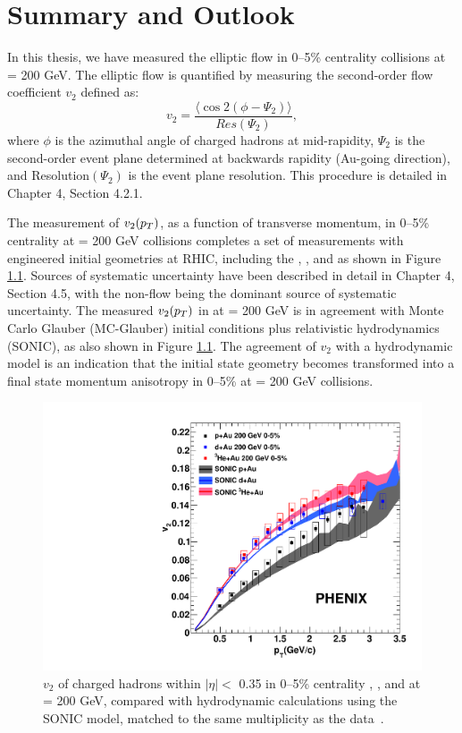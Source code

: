 \chapter{Summary and Outlook}
In this thesis, we have measured the elliptic flow in 0--5\% centrality \pau collisions at \sqsn = 200 GeV. The elliptic flow is quantified by measuring the second-order flow coefficient $v_2$ defined as:
\begin{equation}
v_2 = \frac{\langle\cos 2(\phi-\Psi_2) \rangle}{ Res(\Psi_2)},
\end{equation}
where $\phi$ is the azimuthal angle of charged hadrons at mid-rapidity, $\Psi_2$ is the second-order event plane determined at backwards rapidity (Au-going direction), and Resolution$(\Psi_2)$ is the event plane resolution. This procedure is detailed in Chapter 4, Section 4.2.1.

The measurement of $v_2(\mbox{$p_T$})$, as a function of transverse momentum, in 0--5\% centrality \pau at \sqsn = 200 GeV collisions completes a set of measurements with engineered initial geometries at RHIC, including the \pau, \dau, and \hau as shown in Figure \ref{fig:all_system_hydro_6}. Sources of systematic uncertainty have been described in detail in Chapter 4, Section 4.5, with the non-flow being the dominant source of systematic uncertainty. The measured $v_2(\mbox{$p_T$})$ in \pau at \sqsn = 200 GeV is in agreement with Monte Carlo Glauber (MC-Glauber) initial conditions plus relativistic hydrodynamics (SONIC), as also shown in Figure \ref{fig:all_system_hydro_6}. The agreement of $v_2$ with a hydrodynamic model is an indication that the initial state geometry becomes transformed into a final state momentum anisotropy in 0--5\% \pau at \sqsn = 200 GeV collisions. 

\begin{figure}[!ht]
\begin{center}
\includegraphics[width=0.5\linewidth]{figs/three_system_comparison_result.pdf}
\caption{$v_2$ of charged hadrons within $|\eta| <$ 0.35 in 0--5\% centrality \pau, \dau, and \hau at \sqsn = 200 GeV, compared with hydrodynamic calculations using the SONIC model, matched to the same multiplicity as the data~\cite{Habich:2014jna}.}
\label{fig:all_system_hydro_6}
\end{center}
\end{figure}

